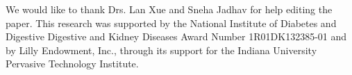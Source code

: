 \documentclass[pdflatex,sn-basic]{sn-jnl}%
\theoremstyle{thmstyleone}%
\theoremstyle{thmstyletwo}%
\theoremstyle{thmstylethree}%
\begin{document}


We would like to thank Drs. Lan Xue and Sneha Jadhav for help editing the paper. This research was supported by the National Institute of Diabetes and Digestive Digestive and Kidney Diseases Award Number 1R01DK132385-01 and by Lilly Endowment, Inc., through its support for the Indiana University Pervasive Technology Institute.







\end{document}
